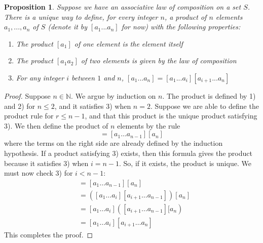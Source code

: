 \documentclass[12pt]{article}
\newtheorem{prop}[thm]{Proposition}
\theoremstyle{definition}
\theoremstyle{remark}
\numberwithin{equation}{section}
\newcommand\N{\mathbb N}    %
\begin{document}
\vspace{15pt}

\begin{prop}
        Suppose we have an associative law of composition on a set $S$. There is a unique way to define, for every integer $n$, a product of $n$ elements $a_1,...,a_n$ of $S$ (denote it by $[a_1...a_n]$ for now) with the following properties: \begin{enumerate}
                \item The product $[a_1]$ of one element is the element itself
                \item The product $[a_1a_2]$ of two elements is given by the law of composition
                \item For any integer $i$ between $1$ and $n$, $[a_1...a_n] = [a_1...a_i][a_{i+1}...a_n]$
        \end{enumerate}
\end{prop}
\begin{proof}
        Suppose $n \in \N$. We argue by induction on $n$. The product is defined by 1) and 2) for $n \leq 2$, and it satisfies 3) when $n = 2$. Suppose we are able to define the product rule for $r \leq n-1$, and that this product is the unique product satisfying 3). We then define the product of $n$ elements by the rule \begin{equation}
                [a_1\hdots a_n] = [a_1\hdots a_{n-1}][a_n]
        \end{equation}
        where the terms on the right side are already defined by the induction hypothesis. If a product satisfying 3) exists, then this formula gives the product because it satisfies 3) when $i = n-1$. So, if it exists, the product is unique. We must now check 3) for $i < n-1$: \begin{align*}
                [a_1\hdots a_n] &= [a_1\hdots a_{n-1}][a_n] \tag{our definition} \\
                &= ([a_1\hdots a_i][a_{i+1}\hdots a_{n-1}])[a_n] \tag{by the induction hypothesis} \\
                &= [a_1\hdots a_i]([a_{i+1}\hdots a_{n-1}][a_n) \tag{by associativity} \\
                &= [a_1\hdots a_i][a_{i+1}\hdots a_n] \tag{by the induction hypothesis}
        \end{align*}
        This completes the proof.
\end{proof}

\vspace{15pt}
\end{document}
